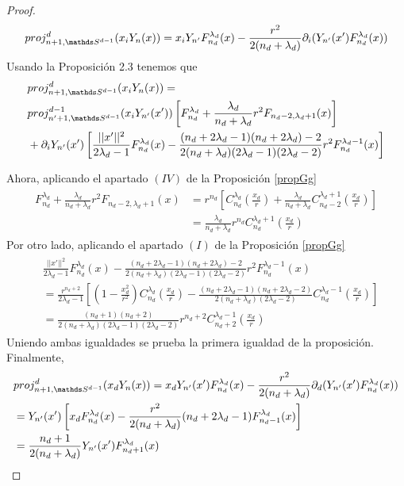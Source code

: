 \begin{proof}
	$$proj_{n+1,\sphere}^d(x_iY_n(x)) = x_iY_{n'} F_{n_d}^{\lambda_d}(x)-\frac{r^2}{2(n_d+\lambda_d)}\partial_i(Y_{n'}(x')F_{n_d}^{\lambda_d}(x))$$
	Usando la Proposición 2.3 tenemos que
	\begin{gather*}
	\begin{aligned}
	&proj_{n+1,\sphere}^d(x_iY_n(x))= \\ & proj_{n'+1,\sphere}^{d-1}(x_iY_{n'}(x'))\left[F_{n_d}^{\lambda_d}+\frac{\lambda_d}{n_d+\lambda_d}r^2F_{n_d-2,\lambda_d+1}(x)\right]\\&+\partial_iY_{n'}(x')\left[\frac{||x'||^2}{2\lambda_d-1}F_{n_d}^{\lambda_d}(x)-\frac{(n_d+2\lambda_d-1)(n_d+2\lambda_d)-2}{2(n_d+\lambda_d)(2\lambda_d-1)(2\lambda_d-2)}r^2F_{n_d}^{\lambda_d-1}(x)\right]
	\end{aligned}
	\end{gather*} 
	
	Ahora, aplicando el apartado $(IV)$ de la Proposición \ref{propGg}
	\begin{gather*}
	\begin{aligned}
	F_{n_d}^{\lambda_d}+\frac{\lambda_d}{n_d+\lambda_d}r^2F_{n_d-2,\lambda_d+1}(x) &= r^{n_d}\left[C_{n_d}^{\lambda_d}(\frac{x_d}{r})+\frac{\lambda_d}{n_d+\lambda_d}C_{n_d-2}^{\lambda_d+1}(\frac{x_d}{r})\right] \\&= \frac{\lambda_d}{n_d+\lambda_d}r^{n_d}C_{n_d}^{\lambda_d+1}(\frac{x_d}{r})
	\end{aligned}
	\end{gather*}
	Por otro lado, aplicando el apartado $(I)$ de la Proposición \ref{propGg}
	\begin{gather*}
	\begin{aligned}
	&\frac{||x'||^2}{2\lambda_d-1}F_{n_d}^{\lambda_d}(x)-\frac{(n_d+2\lambda_d-1)(n_d+2\lambda_d)-2}{2(n_d+\lambda_d)(2\lambda_d-1)(2\lambda_d-2)}r^2F_{n_d}^{\lambda_d-1}(x) \\&= \frac{r^{n_d+2}}{2\lambda_d-1}\left[(1-\frac{x_d^2}{r^2})C_{n_d}^{\lambda_d}(\frac{x_d}{r})-\frac{(n_d+2\lambda_d-1)(n_d+2\lambda_d-2)}{2(n_d+\lambda_d)(2\lambda_d-2)}C_{n_d}^{\lambda_d - 1}(\frac{x_d}{r})\right] \\ &= \frac{(n_d+1)(n_d+2)}{2(n_d+\lambda_d)(2\lambda_d-1)(2\lambda_d-2)}r^{n_d+2}C_{n_d+2}^{\lambda_d-1}(\frac{x_d}{r})
	\end{aligned}
	\end{gather*}
	Uniendo ambas igualdades se prueba la primera igualdad de la proposición.
	\\Finalmente,
	\begin{gather*}
	\begin{aligned}
	&proj_{n+1,\sphere}^d(x_dY_n(x)) = x_dY_{n'}(x')F_{n_d}^{\lambda_d}(x)-\frac{r^2}{2(n_d+\lambda_d)}\partial_d(Y_{n'}(x')F_{n_d}^{\lambda_d}(x)) \\&=Y_{n'}(x')\left[x_dF_{n_d}^{\lambda_d}(x)-\frac{r^2}{2(n_d+\lambda_d)}(n_d+2\lambda_d-1)F_{n_d-1}^{\lambda_d}(x)\right] \\&= \frac{n_d+1}{2(n_d+\lambda_d)}Y_{n'}(x')F_{n_d+1}^{\lambda_d}(x)
	\end{aligned}
	\end{gather*}
\end{proof}
